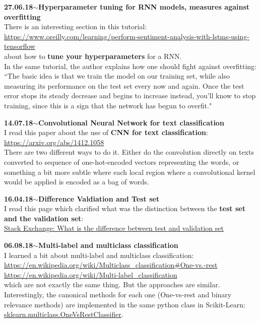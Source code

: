\documentclass[11pt,a4paper]{article}
\newenvironment{loggentry}[2]%
{\noindent\textbf{#1}\hspace{1cm}$\mathbf{\sim}$\text{ }\textbf{#2}\\}{\vspace{0.5cm}}
\begin{document}
\begin{loggentry}{27.06.18}{Hyperparameter tuning for RNN models, measures against overfitting}
There is an interesting section in this tutorial:\\
\url{https://www.oreilly.com/learning/perform-sentiment-analysis-with-lstms-using-tensorflow}\\
about how to \textbf{tune your hyperparameters} for a RNN.\\

In the same tutorial, the author explains how one should fight against overfitting: ``The basic idea is that we train the model on our training set, while also measuring its performance on the test set every now and again. Once the test error stops its steady decrease and begins to increase instead, you'll know to stop training, since this is a sign that the network has begun to overfit."
\end{loggentry}

\begin{loggentry}{14.07.18}{Convolutional Neural Network for text classification}
I read this paper about the use of \textbf{CNN for text classification}:\\
\url{https://arxiv.org/abs/1412.1058}\\
There are two different ways to do it. Either do the convolution directly on texts converted to sequence of one-hot-encoded vectors representing the words, or something a bit more subtle where each local region where a convolutional kernel would be applied is encoded as a bag of words.
\end{loggentry}

\begin{loggentry}{16.04.18}{Difference Valdiation and Test set}
I read this page which clarified what was the distinction between the \textbf{test set and the validation set}:\\
\href{https://stats.stackexchange.com/questions/19048/what-is-the-difference-between-test-set-and-validation-set#19051}{Stack Exchange: What is the difference between test and validation set}
\end{loggentry}

\begin{loggentry}{06.08.18}{Multi-label and multiclass classification}
I learned a bit about multi-label and multiclass classification:\\
\url{https://en.wikipedia.org/wiki/Multiclass_classification#One-vs.-rest}\\
\url{https://en.wikipedia.org/wiki/Multi-label_classification}\\
which are not exactly the same thing. But the approaches are similar. Interestingly, the canonical methods for each one (One-vs-rest and binary relevance methods) are implemented in the same python class in Scikit-Learn: \href{http://scikit-learn.org/stable/modules/generated/sklearn.multiclass.OneVsRestClassifier.html}{sklearn.multiclass.OneVsRestClassifier}.\\
\end{loggentry}
\end{document}
